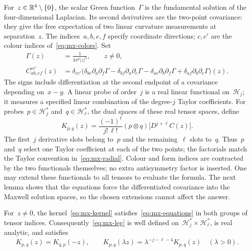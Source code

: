 For~$z\in\mathbb R^4\setminus\{0\}$, the scalar Green function~$\Gamma$ is the fundamental solution of the four-dimensional Laplacian. Its second derivatives are the two-point covariance: they give the free expectation of two linear curvature measurements at separation~$z$.
The indices~$a,b,e,f$ specify coordinate directions; $c,c'$ are the colour indices of~\eqref{eq:mx-colors}.
Set
\begin{equation}\label{eq:mx-kernel}
\begin{aligned}
 \Gamma(z)&=\frac{1}{4\pi^2|z|^2},\qquad z\ne0,\\
 C^{cc'}_{ab,ef}(z)&=\delta_{cc'}\bigl(
 \delta_{be}\partial_a\partial_f\Gamma
 -\delta_{bf}\partial_a\partial_e\Gamma
 -\delta_{ae}\partial_b\partial_f\Gamma
 +\delta_{af}\partial_b\partial_e\Gamma\bigr)(z).
\end{aligned}
\end{equation}
The signs include differentiation at the second endpoint of a covariance depending on~$x-y$.
A linear probe of order~$j$ is a real linear functional on~$\mathcal H_j$; it measures a specified linear combination of the degree-$j$ Taylor coefficients.
For probes~$p\in\mathcal H_j^*$ and~$q\in\mathcal H_\ell^*$, the dual spaces of these real tensor spaces, define
\begin{equation}\label{eq:mx-leg}
 K_{p,q}(z)=\frac{(-1)^\ell}{j!\,\ell!}
 (p\otimes q)\bigl[D^{j+\ell}C(z)\bigr].
\end{equation}
The first~$j$ derivative slots belong to~$p$ and the remaining~$\ell$ slots to~$q$. Thus~$p$ and~$q$ select one Taylor coefficient at each of the two points; the factorials match the Taylor convention in~\eqref{eq:mx-radial}.
Colour and form indices are contracted by the two functionals themselves; no extra antisymmetry factor is inserted.
One may extend these functionals to all tensors to evaluate the formula. The next lemma shows that the equations force the differentiated covariance into the Maxwell solution spaces, so the chosen extensions cannot affect the answer.

\begin{lemma}\label{lem:mx-kernel}
For~$z\ne0$, the kernel~\eqref{eq:mx-kernel} satisfies~\eqref{eq:mx-equations} in both groups of tensor indices.
Consequently~\eqref{eq:mx-leg} is well defined on~$\mathcal H_j^*\times\mathcal H_\ell^*$, is real analytic, and satisfies
\begin{equation}\label{eq:mx-leg-laws}
 K_{p,q}(z)=K_{q,p}(-z),\qquad
 K_{p,q}(\lambda z)=\lambda^{-j-\ell-4}K_{p,q}(z)\quad(\lambda>0).
\end{equation}
\end{lemma}

